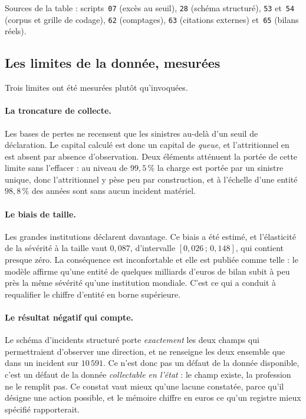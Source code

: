 \documentclass[12pt,a4paper]{article}
\theoremstyle{definition}
\begin{document}
\vspace{2pt}
\noindent Sources de la table : scripts~\texttt{07} (excès au seuil), \texttt{28}
(schéma structuré), \texttt{53} et~\texttt{54} (corpus et grille de codage),
\texttt{62} (comptages), \texttt{63} (citations externes) et~\texttt{65}
(bilans réels).

\subsection{Les limites de la donnée, mesurées}
\label{ss:limites-donnee}

Trois limites ont été mesurées plutôt qu'invoquées.

\paragraph{La troncature de collecte.} Les bases de pertes ne recensent que les
sinistres au-delà d'un seuil de déclaration. Le capital calculé est donc un
capital de \emph{queue}, et l'attritionnel en est absent par absence
d'observation. Deux éléments atténuent la portée de cette limite sans l'effacer :
au niveau de $99{,}5\,\%$ la charge est portée par un sinistre unique, donc
l'attritionnel y pèse peu par construction, et à l'échelle d'une entité
$98{,}8\,\%$ des années sont sans aucun incident matériel.

\paragraph{Le biais de taille.} Les grandes institutions déclarent davantage. Ce
biais a été estimé, et l'élasticité de la sévérité à la taille vaut $0{,}087$,
d'intervalle $[0{,}026\,;\,0{,}148]$, qui contient presque zéro. La conséquence
est inconfortable et elle est publiée comme telle : le modèle affirme qu'une
entité de quelques milliards d'euros de bilan subit à peu près la même sévérité
qu'une institution mondiale. C'est ce qui a conduit à requalifier le chiffre
d'entité en borne supérieure.

\paragraph{Le résultat négatif qui compte.} Le schéma d'incidents structuré porte
\emph{exactement} les deux champs qui permettraient d'observer une direction, et
ne renseigne les deux ensemble que dans un incident sur $10\,591$. Ce n'est donc
pas un défaut de la donnée disponible, c'est un défaut de la donnée
\emph{collectable en l'état} : le champ existe, la profession ne le remplit pas.
Ce constat vaut mieux qu'une lacune constatée, parce qu'il désigne une action
possible, et le mémoire chiffre en euros ce qu'un registre mieux spécifié
rapporterait.
\end{document}
